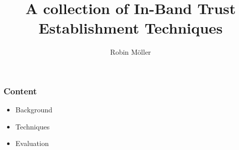 \documentclass{beamer}
\title{A collection of In-Band Trust Establishment Techniques}
\author{Robin Möller}
\institute[]{Technical University Munich}
\begin{document}
\begin{frame}
\titlepage
\end{frame}

\begin{frame}
\frametitle{Content}
\begin{itemize}
	\item Background
	\item Techniques
	\item Evaluation
\end{itemize}
\end{frame}
\end{document}
